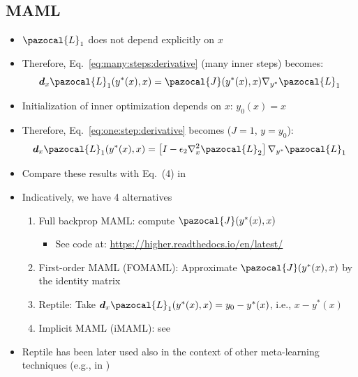 \subsection{MAML}
\begin{itemize}
	\item $\pazocal{L}_1$ does not depend explicitly on $x$
	\item Therefore, Eq.~\eqref{eq:many:steps:derivative} (many inner steps) becomes:
	\begin{equation}\label{}
		\boldsymbol{d}_x\pazocal{L}_1(y^*(x), x) = \pazocal{J}(y^*(x), x) \nabla_{y^*}\pazocal{L}_1 
	\end{equation}
	\item Initialization of inner optimization depends on $x$: $y_0(x) = x$
	\item Therefore, Eq.~\eqref{eq:one:step:derivative} becomes ($J = 1$, $y=y_0$):
	\begin{equation}
		\boldsymbol{d}_x\pazocal{L}_1(y^*(x), x) = \left[I - \epsilon_2 \nabla_{x}^2\pazocal{L}_2\right]\nabla_{y^*}\pazocal{L}_1 
	\end{equation}	
	\item Compare these results with Eq.~(4) in \textcite{nichol2018firstorder}
	\item Indicatively, we have 4 alternatives
	\begin{enumerate}
		\item Full backprop MAML: compute $\pazocal{J}(y^*(x), x)$
		\begin{itemize}
			\item See code at: \href{https://higher.readthedocs.io/en/latest/}{https://higher.readthedocs.io/en/latest/}
		\end{itemize}
		\item First-order MAML (FOMAML): Approximate $\pazocal{J}(y^*(x), x)$ by the identity matrix
		\item Reptile: Take $\boldsymbol{d}_x\pazocal{L}_1(y^*(x), x) = y_0 - y^*(x)$, i.e., $x - y^*(x)$
		\item Implicit MAML (iMAML): see \textcite{rajeswaran2019metalearning}
	\end{enumerate}
	\item Reptile has been later used also in the context of other meta-learning techniques (e.g., in \cite{shaw2019meta})
\end{itemize}

